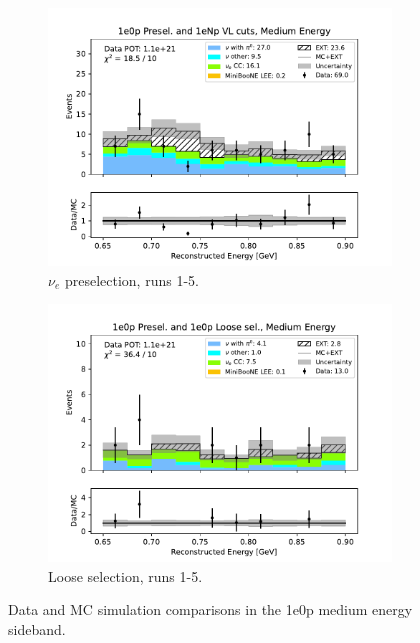 \begin{figure}[H]
\begin{subfigure}{0.5\linewidth}
        \includegraphics[width=\linewidth]{technote/Sidebands/Figures/NearSideband/near_sideband_reco_e_run1234b4c4d5_ZP_ZP_MEDIUM_ENERGY.pdf}
        \caption{$\nu_e$ preselection, runs 1-5.}
    \end{subfigure}%
    \begin{subfigure}{0.5\linewidth}
        \includegraphics[width=\linewidth]{technote/Sidebands/Figures/NearSideband/near_sideband_reco_e_run1234b4c4d5_ZP_ZPLOOSESEL_MEDIUM_ENERGY.pdf}
        \caption{Loose selection, runs 1-5.}
    \end{subfigure}
    \caption{Data and MC simulation comparisons in the 1e0p medium energy sideband.}
\end{figure}

